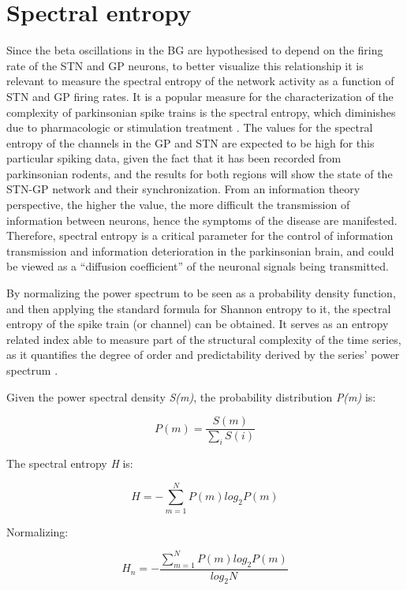 \documentclass{kththesis}
\begin{document}
\section{Spectral entropy}

Since the beta oscillations in the BG are hypothesised to depend on the firing rate of the STN and GP neurons, to better visualize this relationship it is relevant to measure the spectral entropy of the network activity as a function of STN and GP firing rates. 
It is a popular measure for the characterization of the complexity of parkinsonian spike trains is the spectral entropy, which diminishes due to pharmacologic or stimulation treatment \parencite{Andres}. 
The values for the spectral entropy of the channels in the GP and STN are expected to be high for this particular spiking data, given the fact that it has been recorded from parkinsonian rodents, and the results for both regions will show the state of the STN-GP network and their synchronization. From an information theory perspective, the higher the value, the more difficult the transmission of information between neurons, hence the symptoms of the disease are manifested. Therefore, spectral entropy is a critical parameter for the control of information transmission and information deterioration in the parkinsonian brain, and could be viewed as a “diffusion coefficient” of the neuronal signals being transmitted.

By normalizing the power spectrum to be seen as a probability density function, and then applying the standard formula for Shannon entropy to it, the spectral entropy of the spike train (or channel) can be obtained. 
It serves as an entropy related index able to measure part of the structural complexity of the time series, as it quantifies the degree of order and predictability derived by the series' power spectrum \parencite{Zacca}.

Given the power spectral density \textit{S(m)}, the probability distribution \textit{P(m)} is:

\begin{equation}
P(m) = \frac{S(m)}{\sum_i S(i)}
\end{equation}

The spectral entropy \textit{H} is:

\begin{equation}
H = -\sum_{m=1}^N P(m) log_2 P(m)
\end{equation}

Normalizing:

\begin{equation}
H_n = -\frac{\sum_{m=1}^N P(m) log_2 P(m)}{log_2 N}
\end{equation}
\end{document}
